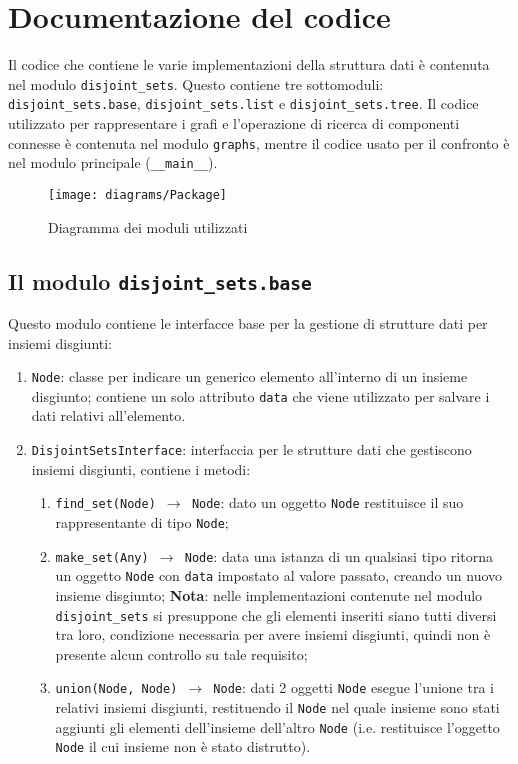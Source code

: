 \section{Documentazione del codice}
Il codice che contiene le varie implementazioni della struttura dati è
contenuta nel modulo \texttt{disjoint\_sets}. Questo contiene tre sottomoduli:
\texttt{disjoint\_sets.base}, \texttt{disjoint\_sets.list} e \texttt{disjoint\_sets.tree}.
Il codice utilizzato per rappresentare i grafi e l'operazione di ricerca di componenti
connesse è contenuta nel modulo \texttt{graphs}, mentre il codice usato per il confronto
è nel modulo principale (\texttt{\_\_main\_\_}).

\begin{figure}[!h]
      \centering
      \texttt{[image: diagrams/Package]}
      \caption{Diagramma dei moduli utilizzati}
\end{figure}


\subsection{Il modulo \texttt{disjoint\_sets.base}}
Questo modulo contiene le interfacce base per la gestione di
strutture dati per insiemi disgiunti:

\begin{enumerate}
      \item \texttt{Node}: classe per indicare un generico elemento all'interno di un insieme
            disgiunto; contiene un solo attributo \texttt{data} che viene utilizzato per salvare i
            dati relativi all'elemento.
      \item \texttt{DisjointSetsInterface}: interfaccia per le strutture dati che gestiscono
            insiemi disgiunti, contiene i metodi:
            \begin{enumerate}
                  \item \texttt{find\_set(Node) $\rightarrow$ Node}: dato un oggetto \texttt{Node} restituisce il suo rappresentante
                        di tipo \texttt{Node};
                  \item \texttt{make\_set(Any) $\rightarrow$ Node}: data una istanza di un qualsiasi tipo ritorna un oggetto \texttt{Node}
                        con \texttt{data} impostato al valore passato, creando un nuovo insieme disgiunto;
                        \textbf{Nota}: nelle implementazioni contenute nel modulo \texttt{disjoint\_sets} si presuppone che gli elementi
                        inseriti siano tutti diversi tra loro, condizione necessaria per avere insiemi disgiunti, quindi non è presente
                        alcun controllo su tale requisito;
                  \item \texttt{union(Node, Node) $\rightarrow$ Node}: dati 2 oggetti \texttt{Node} esegue l'unione tra i relativi insiemi
                        disgiunti, restituendo il \texttt{Node} nel quale insieme sono stati aggiunti gli elementi dell'insieme
                        dell'altro \texttt{Node} (i.e. restituisce l'oggetto \texttt{Node} il cui insieme non è stato distrutto).
            \end{enumerate}
\end{enumerate}

